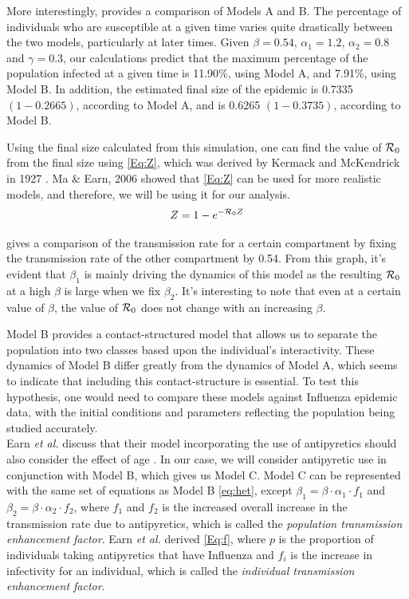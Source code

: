 \documentclass[a4paper, 12pt, journal]{ieeeconf}\usepackage[]{graphicx}\usepackage[]{color}
\begin{document}
More interestingly,  provides a comparison of Models A and B. The percentage of individuals who are susceptible at a given time varies quite drastically between the two models, particularly at later times. Given $\beta = 0.54$, $\alpha_1 = 1.2$, $\alpha_2 = 0.8$ and $\gamma = 0.3$, our calculations predict that the maximum percentage of the population infected at a given time is 11.90\%, using Model A, and 7.91\%, using Model B. In addition, the estimated final size of the epidemic is 0.7335 $(1-0.2665)$, according to Model A, and is 0.6265 $(1 - 0.3735)$, according to Model B. 

Using the final size calculated from this simulation, one can find the value of $\R_0$ from the final size using \eqref{Eq:Z}, which was derived by Kermack and McKendrick in 1927 \cite{Kermack700}. Ma \& Earn, 2006 \cite{Ma2006} showed that \eqref{Eq:Z} can be used for more realistic models, and therefore, we will be using it for our analysis.
\begin{equation}\label{Eq:Z}
Z = 1 - e^{-\R_0 Z}
\end{equation}

 gives a comparison of the transmission rate for a certain compartment by fixing the transmission rate of the other compartment by 0.54. From this graph, it's evident that $\beta_1$ is mainly driving the dynamics of this model as the resulting $\R_0$ at a high $\beta$ is large when we fix $\beta_2$. It's interesting to note that even at a certain value of $\beta$, the value of $\R_0$ does not change with an increasing $\beta$.

Model B provides a contact-structured model that allows us to separate the population into two classes based upon the individual's interactivity. These dynamics of Model B differ greatly from the dynamics of Model A, which seems to indicate that including this contact-structure is essential. To test this hypothesis, one would need to compare these models against Influenza epidemic data, with the initial conditions and parameters reflecting the population being studied accurately. 
\\

Earn \textit{et al.} discuss that their model incorporating the use of antipyretics should also consider the effect of age \cite{Earn_fever}. In our case, we will consider antipyretic use in conjunction with Model B, which gives us Model C. Model C can be represented with the same set of equations as Model B \eqref{eq:het}, except $\beta_1 = \beta \cdot \alpha_1 \cdot f_1$ and $\beta_2 = \beta \cdot \alpha_2 \cdot f_2$, where $f_1$ and $f_2$ is the increased overall increase in the transmission rate due to antipyretics, which is called the \textit{population transmission enhancement factor}. Earn \textit{et al.} derived \eqref{Eq:f}, where $p$ is the proportion of individuals taking antipyretics that have Influenza and  $f_i$ is the increase in infectivity for an individual, which is called the \textit{individual transmission enhancement factor}.
\end{document}
